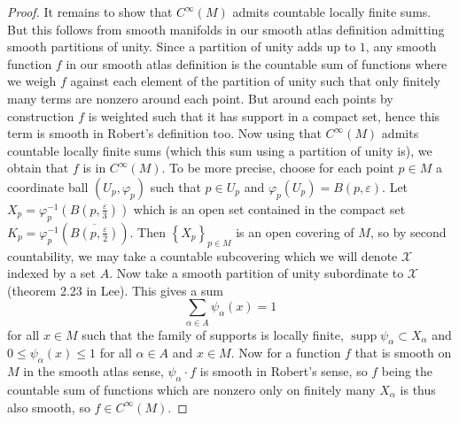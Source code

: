 \documentclass[reqno]{amsart}
\theoremstyle{definition}
\theoremstyle{remark}
\DeclareMathOperator{\supp}{supp}
\begin{document}
\begin{proof}
        It remains to show that
        $C^{\infty}(M)$ admits countable locally
        finite sums. But this follows from smooth
        manifolds in our smooth atlas definition admitting
        smooth partitions of unity. Since a
        partition of unity adds up to $1$, any
        smooth function $f$ in our smooth atlas
        definition is the countable sum of
        functions where we weigh $f$ against
        each element of the partition of unity such that
        only finitely many terms are nonzero
        around each point. But around each
        points by construction $f$ is weighted such that
        it has support in a compact set, hence
        this term is smooth in Robert's definition too.
        Now using that $C^{\infty}(M)$ admits countable
        locally finite sums (which this sum 
        using a partition of unity is), we obtain that
        $f$ is in $C^{\infty}(M)$.
        To be more precise, 
        choose for each point $p \in M$ a coordinate ball
        $\left( U_p, \varphi_p \right) $ such that
        $p \in U_p$ and $\varphi_p (U_p) =
        B(p, \varepsilon)$. 
        Let
        $X_p = \varphi_p^{-1}
        \left( B \left( p, \frac{\varepsilon}{3} \right)  \right) $
        which is an open set contained in the compact set
        $K_p = \varphi_p^{-1}\left( 
        \overline{B \left( p, \frac{\varepsilon}{2} \right) }
    \right) $. Then
    $\left\{ X_p \right\}_{p \in M} $ is an open covering
    of $M$, so by second countability, we may take
    a countable subcovering  which we will denote
     $\mathcal{X}$ indexed
     by a set $A$. Now take a
     smooth partition of unity subordinate to
     $\mathcal{X}$ (theorem 2.23 in Lee).
     This gives a sum
     \[
     \sum_{\alpha \in A} \psi_{\alpha}(x) = 1
     \] 
     for all $x \in M$ such that the family
     of supports is locally finite,
     $\supp \psi_{\alpha} \subset 
     X_{\alpha}$ and
     $0 \le \psi_{\alpha}(x) \le 1$ for
     all $\alpha \in A$ and $x \in M$. Now for a function
     $f$ that is smooth on $M$ in the smooth atlas sense,
     $\psi_{\alpha} \cdot f$ is smooth in Robert's
     sense, so
     $f$ being the countable sum of functions which 
     are nonzero only on finitely many 
     $X_{\alpha}$ is thus also smooth, so
     $f \in C^{\infty}(M)$.



    \end{proof}
\end{document}
